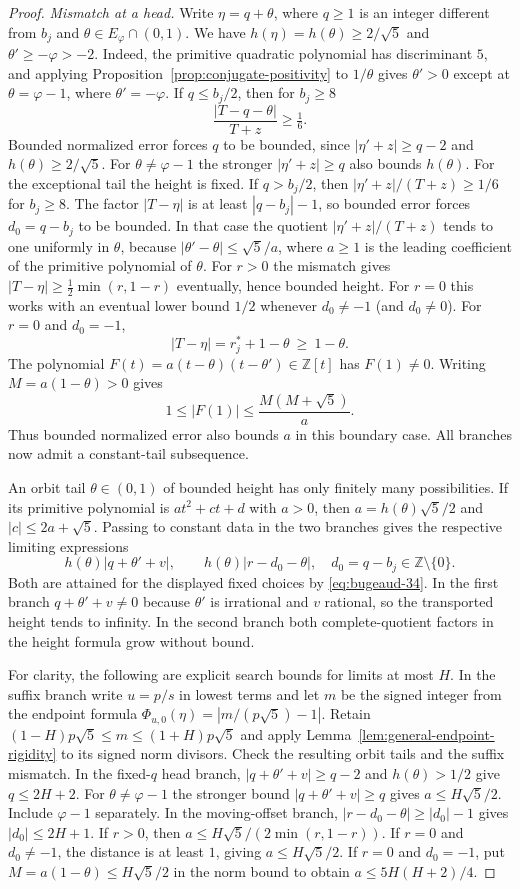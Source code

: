 \documentclass[11pt]{amsart}
\theoremstyle{definition}
\theoremstyle{remark}
\numberwithin{equation}{section}
\newcommand{\Z}{\mathbb{Z}}
\begin{document}
\begin{proof}
\emph{Mismatch at a head.} Write $\eta=q+\theta$, where $q\ge1$ is an
integer different from $b_j$ and $\theta\in E_\varphi\cap(0,1)$. We have
$h(\eta)=h(\theta)\ge2/\sqrt5$ and $\theta'\ge-\varphi>-2$.
Indeed, the primitive quadratic polynomial has discriminant $5$,
and applying Proposition~\ref{prop:conjugate-positivity} to
$1/\theta$ gives $\theta'>0$ except at $\theta=\varphi-1$,
where $\theta'=-\varphi$. If $q\le b_j/2$, then for $b_j\ge8$
\[
 \frac{|T-q-\theta|}{T+z}\ge\tfrac16.
\]
Bounded normalized error forces $q$ to be bounded, since
$|\eta'+z|\ge q-2$ and $h(\theta)\ge2/\sqrt5$. For
$\theta\ne\varphi-1$ the stronger $|\eta'+z|\ge q$ also bounds
$h(\theta)$. For the exceptional tail the height is fixed.
If $q>b_j/2$, then $|\eta'+z|/(T+z)\ge1/6$ for $b_j\ge8$.
The factor $|T-\eta|$ is at least $|q-b_j|-1$, so bounded error
forces $d_0=q-b_j$ to be bounded. In that case the quotient
$|\eta'+z|/(T+z)$ tends to one uniformly in $\theta$, because
$|\theta'-\theta|\le\sqrt5/a$, where $a\ge1$ is the leading coefficient
of the primitive polynomial of $\theta$. For $r>0$ the mismatch
gives $|T-\eta|\ge\frac12\min(r,1-r)$ eventually, hence bounded
height. For $r=0$ this works with an eventual lower bound $1/2$
whenever $d_0\ne-1$ (and $d_0\ne0$). For $r=0$ and $d_0=-1$,
\[
 |T-\eta|=r_j^*+1-\theta\ \ge\ 1-\theta.
\]
The polynomial $F(t)=a(t-\theta)(t-\theta')\in\Z[t]$ has $F(1)\ne0$.
Writing $M=a(1-\theta)>0$ gives
\[
 1\le |F(1)|\le \frac{M(M+\sqrt5)}{a}.
\]
Thus bounded normalized error also bounds $a$ in this boundary case.
All branches now admit a constant-tail subsequence.

An orbit tail $\theta\in(0,1)$ of bounded height has only finitely
many possibilities. If its primitive polynomial is
$a t^2+ct+d$ with $a>0$, then $a=h(\theta)\sqrt5/2$ and
$|c|\le2a+\sqrt5$. Passing to constant data in the two branches
gives the respective limiting expressions
\[
 h(\theta)|q+\theta'+v|,\qquad
 h(\theta)|r-d_0-\theta|,\quad d_0=q-b_j\in\Z\setminus\{0\}.
\]
Both are attained for the displayed fixed choices by
\eqref{eq:bugeaud-34}. In the first branch $q+\theta'+v\ne0$
because $\theta'$ is irrational and $v$ rational, so the transported
height tends to infinity. In the second branch both complete-quotient
factors in the height formula grow without bound.

For clarity, the following are explicit search bounds for limits
at most $H$. In the suffix branch write $u=p/s$ in lowest terms and
let $m$ be the signed integer from the endpoint formula
$\Phi_{u,0}(\eta)=|m/(p\sqrt5)-1|$. Retain
$(1-H)p\sqrt5\le m\le(1+H)p\sqrt5$ and apply
Lemma~\ref{lem:general-endpoint-rigidity} to its signed norm divisors.
Check the resulting orbit tails and the suffix mismatch.
In the fixed-$q$ head branch, $|q+\theta'+v|\ge q-2$ and
$h(\theta)>1/2$ give $q\le 2H+2$. For
$\theta\ne\varphi-1$ the stronger bound $|q+\theta'+v|\ge q$
gives $a\le H\sqrt5/2$. Include $\varphi-1$ separately.
In the moving-offset branch,
$|r-d_0-\theta|\ge |d_0|-1$ gives $|d_0|\le2H+1$.
If $r>0$, then $a\le H\sqrt5/(2\min(r,1-r))$. If $r=0$
and $d_0\ne-1$, the distance is at least $1$, giving $a\le H\sqrt5/2$.
If $r=0$ and $d_0=-1$, put $M=a(1-\theta)\le H\sqrt5/2$ in the
norm bound to obtain $a\le5H(H+2)/4$.


\end{proof}
\end{document}
